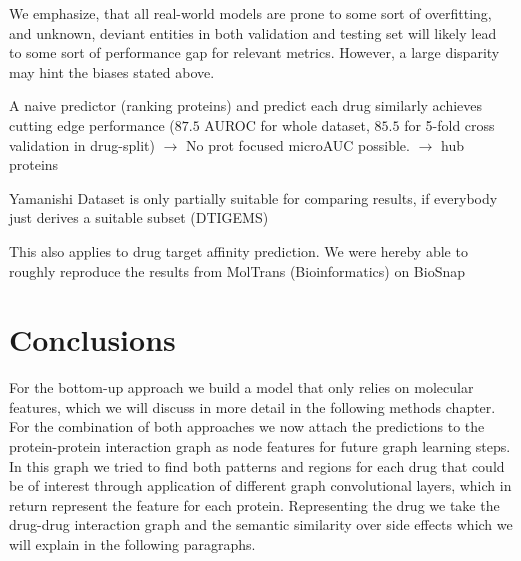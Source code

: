 \documentclass{bioinfo}
\begin{document}
We emphasize, that all real-world models are prone to some sort of
overfitting, and unknown, deviant entities in both validation and
testing set will likely lead to some sort of performance gap for
relevant metrics. However, a large disparity may hint the biases
stated above.

A naive predictor (ranking proteins) and predict each drug similarly
achieves cutting edge performance ($87.5$ AUROC for whole dataset,
$85.5$ for 5-fold cross validation in drug-split) $\rightarrow$ No
prot focused microAUC possible. $\rightarrow$ hub proteins

Yamanishi Dataset is only partially suitable for comparing results, if
everybody just derives a suitable subset (DTIGEMS)

This also applies to drug target affinity prediction. We were hereby
able to roughly reproduce the results from MolTrans (Bioinformatics)
on BioSnap











\section{Conclusions}

For the bottom-up approach we build a model that only relies on
molecular features, which we will discuss in more detail in the
following methods chapter. For the combination of both approaches we
now attach the predictions to the protein-protein interaction graph as
node features for future graph learning steps. In this graph we tried
to find both patterns and regions for each drug that could be of
interest through application of different graph convolutional layers,
which in return represent the feature for each protein. Representing
the drug we take the drug-drug interaction graph and the semantic
similarity over side effects which we will explain in the following
paragraphs.
\end{document}

